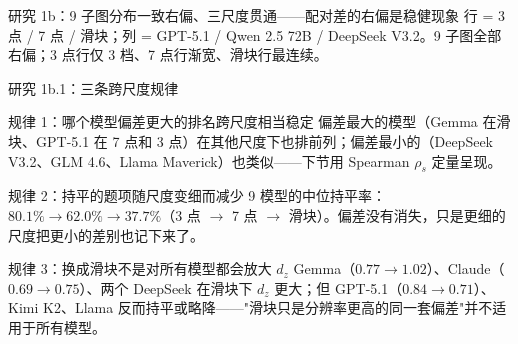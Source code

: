 \documentclass[aspectratio=169,professionalfonts]{beamer}
\begin{document}
\begin{frame}{研究 1b：9 子图分布一致右偏、三尺度贯通——配对差的右偏是稳健现象}
  \vspace{0.2em}
  \footnotesize 行 = 3 点 / 7 点 / 滑块；列 = GPT-5.1 / Qwen 2.5 72B / DeepSeek V3.2。9 子图全部右偏；3 点行仅 3 档、7 点行渐宽、滑块行最连续。
\end{frame}

\begin{frame}{研究 1b.1：三条跨尺度规律}
  \footnotesize
  \begin{block}{规律 1：哪个模型偏差更大的排名跨尺度相当稳定}
    \small 偏差最大的模型（Gemma 在滑块、GPT-5.1 在 7 点和 3 点）在其他尺度下也排前列；偏差最小的（DeepSeek V3.2、GLM 4.6、Llama Maverick）也类似——下节用 Spearman $\rho_s$ 定量呈现。
  \end{block}
  \begin{block}{规律 2：持平的题项随尺度变细而减少}
    \small 9 模型的中位持平率：$80.1\% \to 62.0\% \to 37.7\%$（3 点 $\to$ 7 点 $\to$ 滑块）。偏差没有消失，只是更细的尺度把更小的差别也记下来了。
  \end{block}
  \begin{block}{规律 3：换成滑块不是对所有模型都会放大 $d_z$}
    \small Gemma（$0.77\to 1.02$）、Claude（$0.69\to 0.75$）、两个 DeepSeek 在滑块下 $d_z$ 更大；但 GPT-5.1（$0.84\to 0.71$）、Kimi K2、Llama 反而持平或略降——"滑块只是分辨率更高的同一套偏差"并不适用于所有模型。
  \end{block}
\end{frame}
\end{document}
